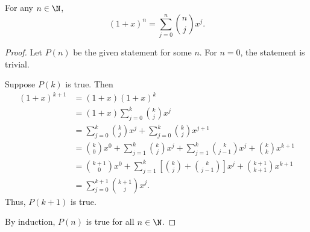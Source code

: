 \begin{theorem} \label{thm:binom:binomial}
    For any $n \in \N$, \[
        (1 + x)^{n} = \sum_{j = 0}^{n} \binom{n}{j} x^{j}.
    \]
\end{theorem}
\begin{proof}
    Let $P(n)$ be the given statement for some $n$.
    For $n = 0$, the statement is trivial.
    
    Suppose $P(k)$ is true.
    Then
    \begin{align*}
        (1 + x)^{k + 1} &= (1 + x)(1 + x)^{k} \\
        &= (1 + x) \sum_{j = 0}^{k} \binom{k}{j} x^{j} \\
        &= \sum_{j = 0}^{k} \binom{k}{j} x^{j} + \sum_{j = 0}^{k} \binom{k}{j} x^{j + 1} \\
        &= \binom{k}{0} x^{0} + \sum_{j = 1}^{k} \binom{k}{j} x^{j}
            + \sum_{j = 1}^{k} \binom{k}{j - 1} x^{j} + \binom{k}{k} x^{k + 1} \\
        &= \binom{k + 1}{0} x^{0} + \sum_{j = 1}^{k} \left[ \binom{k}{j} + \binom{k}{j - 1} \right] x^{j}
            + \binom{k + 1}{k + 1} x^{k + 1} \\
        &= \sum_{j = 0}^{k + 1} \binom{k + 1}{j} x^{j}.
    \end{align*}
    Thus, $P(k + 1)$ is true.

    By induction, $P(n)$ is true for all $n \in \N$.
\end{proof}
